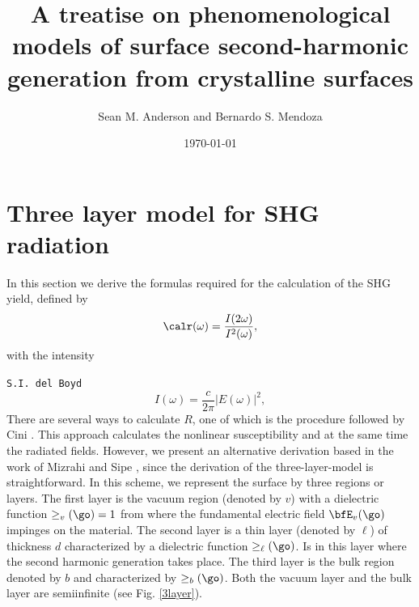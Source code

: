\documentclass[aps,11pt]{revtex4}
\begin{document}
\title{A treatise on phenomenological models of surface second-harmonic
generation from crystalline surfaces}
\author{Sean M. Anderson and Bernardo S. Mendoza }
\date{\today}


\maketitle

\section{Three layer model for SHG radiation}

In this section we derive the formulas required for the calculation of the SHG
yield, defined by
\begin{equation}\label{uno}
\calr(\omega)=\frac{I(2\omega)}{I^2(\omega)}
,
\end{equation}
with the intensity

\verb=S.I. del Boyd=
\begin{equation}\label{dos}
I(\omega)=\frac{c}{2\pi}|E(\omega)|^2
,
\end{equation}
There are several ways to calculate $R$, one of which is the procedure followed
by Cini \cite{ciniPRB91}. This approach calculates the nonlinear susceptibility
and at the same time the radiated fields. However, we present an alternative
derivation based in the work of Mizrahi and Sipe \cite{mizrahiJOSA88}, since
the derivation of the three-layer-model is straightforward. 
In this scheme, 
we represent the surface by three regions or layers. The first layer
is the vacuum region (denoted by $v$) with a dielectric function $\ge_v(\go)=1$ from
where the fundamental electric field $\bfE_v(\go)$ impinges on the material. 
The second  layer is a thin layer (denoted by $\ell$) of thickness $d$ characterized
by a dielectric function $\ge_\ell(\go)$. Is in this layer where the
second harmonic generation takes place. The third layer is the bulk
region denoted by $b$ and characterized by $\ge_b(\go)$. 
Both the vacuum layer and the
bulk layer are semiinfinite  (see Fig. \ref{3layer}). 
\end{document}
